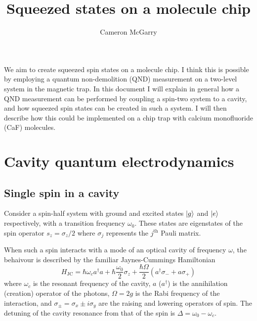 \documentclass{article}
\title{Squeezed states on a molecule chip}
\author{Cameron McGarry}
\begin{document}
\maketitle

We aim to create squeezed spin states on a molecule chip. I think this is
possible by employing a quantum non-demolition (QND) measurement on a two-level
system in the magnetic trap. In this document I will explain in general how
a QND measurement can be performed by coupling a spin-two system to a cavity,
and how squeezed spin states can be created in such a system. I will then
describe how this could be implemented on a chip trap with calcium monofluoride
(CaF) molecules.

\section{Cavity quantum electrodynamics}

\subsection{Single spin in a cavity}

Consider a spin-half system with ground and excited states $\ket{g}$
and $\ket{e}$ respectively, with a transition frequency $\omega_0$. These
states are eigenstates of the spin operator $s_z = \sigma_z /2$ where
$\sigma_j$ represents the $j^\text{th}$ Pauli matrix.

When such a spin interacts with a mode of an optical cavity of frequency
$\omega$, the behaivour is described by the familiar Jaynes-Cummings
Hamiltonian~\cite{}
%
\begin{equation}
  H_\text{JC} = \hbar\omega_c a^\dagger a + \hbar\frac{\omega_0}{2}\sigma_z +
  \frac{\hbar\Omega}{2}(a^\dagger \sigma_- + a\sigma_+)
  \label{JCH}
\end{equation}
%
where $\omega_c$ is the resonant frequency of the cavity, $a$ ($a^\dagger$) is
the annihilation (creation) operator of the photons, $\Omega = 2g$ is the Rabi
frequency of the interaction, and $\sigma_\pm = \sigma_x \pm i\sigma_y$ are the
raising and lowering operators of spin. The detuning of the cavity resonance
from that of the spin is $\Delta = \omega_0 - \omega_c$.
\end{document}
